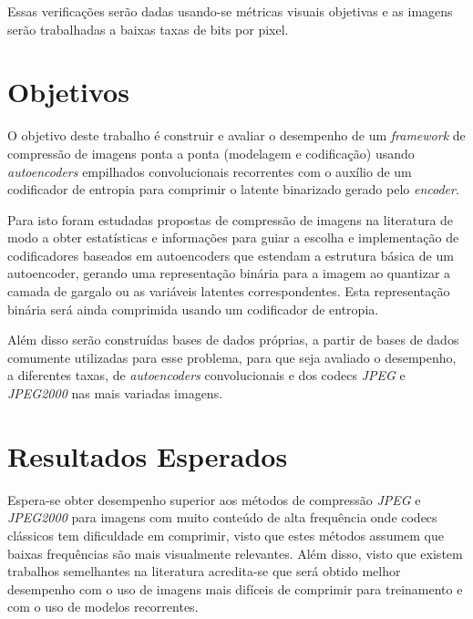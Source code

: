 Essas verificações serão dadas usando-se métricas visuais objetivas e as imagens serão trabalhadas a baixas taxas de bits por pixel.
\section{Objetivos}
\label{sec:objetivos}
O objetivo deste trabalho é construir e avaliar o desempenho de um \textit{framework} de compressão de imagens ponta a ponta (modelagem e codificação) usando \textit{autoencoders} empilhados convolucionais recorrentes com o auxílio de um codificador de entropia para comprimir o latente binarizado gerado pelo \textit{encoder}. 

Para isto foram estudadas propostas de compressão de imagens na literatura de modo a obter estatísticas e informações para guiar a escolha e implementação de codificadores baseados em autoencoders que estendam a estrutura básica de um autoencoder, gerando uma representação binária para a imagem ao quantizar a camada de gargalo ou as variáveis latentes correspondentes. Esta representação binária será ainda comprimida usando um codificador de entropia. 

Além disso serão construídas bases de dados próprias, a partir de bases de dados comumente utilizadas para esse problema, para que seja avaliado o desempenho, a diferentes taxas, de \textit{autoencoders} convolucionais e dos codecs \textit{JPEG} e \textit{JPEG2000} nas mais variadas imagens. 
\section{Resultados Esperados}
\label{sec:expectativa}
Espera-se obter desempenho superior aos métodos de compressão \textit{JPEG} e \textit{JPEG2000} para imagens com muito conteúdo de alta frequência onde codecs clássicos tem dificuldade em comprimir, visto que estes métodos assumem que baixas frequências são mais visualmente relevantes. Além disso, visto que existem trabalhos semelhantes na literatura acredita-se que será obtido melhor desempenho com o uso de imagens mais difíceis de comprimir para treinamento e com o uso de modelos recorrentes. 

